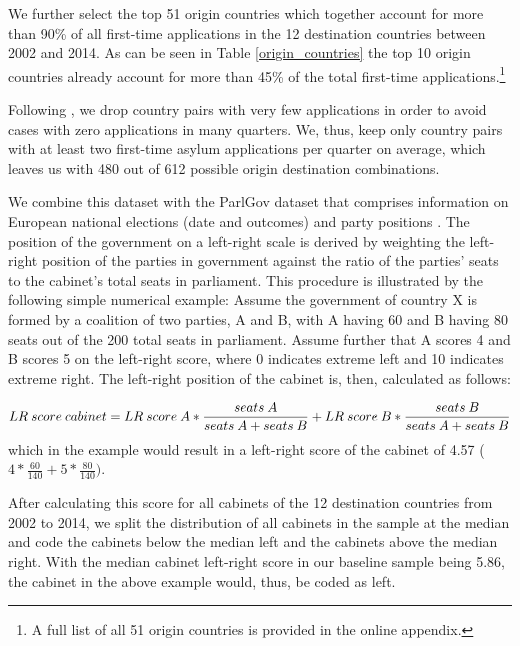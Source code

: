 \documentclass[a4paper,12pt]{article}
\begin{document}


We further select the top 51 origin countries which together account for more than 90\% of all first-time applications in the 12 destination countries between 2002 and 2014. As can be seen in Table \ref{origin_countries} the top 10 origin countries already account for more than 45\% of the total first-time applications.\footnote{A full list of all 51 origin countries is provided in the online appendix.}



Following \cite{hatton2016}, we drop country pairs with very few applications in order to avoid cases with zero applications in many quarters. We, thus, keep only country pairs with at least two first-time asylum applications per quarter on average, which leaves us with 480 out of 612 possible origin destination combinations.

We combine this dataset with the ParlGov dataset that comprises information on European national elections (date and outcomes) and party positions \citep{parlgov2016}. The position of the government on a left-right scale is derived by weighting the left-right position of the parties in government  against the ratio of the parties' seats to the cabinet's total seats in parliament. This procedure is illustrated by the following simple numerical example: Assume the government of country X is formed by a coalition of two parties, A and B, with A having 60 and B having 80 seats out of the 200 total seats in parliament. Assume further that A scores 4 and B scores 5 on the left-right score, where 0 indicates extreme left and 10 indicates extreme right. The left-right position of the cabinet is, then, calculated as follows: 

\begin{equation*}
\tiny
LR~score~cabinet = LR~score~A * \frac{seats~A}{seats~A + seats~B} +LR~score~B * \frac{seats~B}{seats~A + seats~B} 
\end{equation*}which in the example would result in a left-right score of the cabinet of 4.57 ($4*\frac{60}{140} +5*\frac{80}{140})$.

After calculating this score for all cabinets of the 12 destination countries from 2002 to 2014, we split the distribution of all cabinets in the sample at the median and code the cabinets below the median left and the cabinets above the median right. With the median cabinet left-right score in our baseline sample being 5.86, the cabinet in the above example would, thus, be coded as left. 
\end{document}
